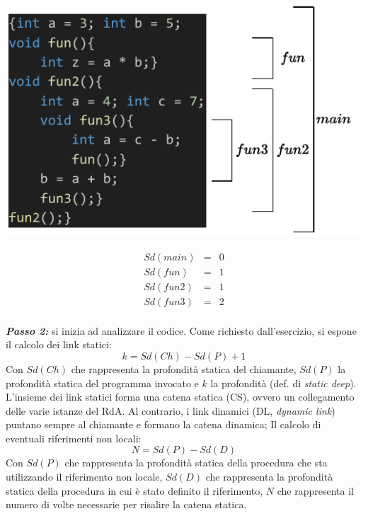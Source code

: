 \documentclass[a4paper]{article}
\begin{document}
	\noindent
	\begin{minipage}{.7\textwidth}
		\begin{center}
			\includegraphics[width=\textwidth]{img/ex3-014.pdf}
		\end{center}
	\end{minipage}
	\begin{minipage}{.3\textwidth}
		\begin{equation*}
			\begin{array}{rcl}
				Sd\left(main\right) &=& 0 \\
				Sd\left(fun\right) &=& 1 \\
				Sd\left(fun2\right) &=& 1 \\
				Sd\left(fun3\right) &=& 2 \\
			\end{array}
		\end{equation*}
	\end{minipage}\newline
	
	\noindent
	\textbf{\emph{Passo 2:}} si inizia ad analizzare il codice. Come richiesto dall'esercizio, si espone il calcolo dei link statici:
	\begin{equation*}
		k = Sd(Ch) - Sd(P) + 1
	\end{equation*}
	Con $Sd(Ch)$ che rappresenta la profondità statica del chiamante, $Sd(P)$ la profondità statica del programma invocato e $k$ la profondità (def. di \emph{static deep}). L'insieme dei link statici forma una catena statica (CS), ovvero un collegamento delle varie istanze del RdA. Al contrario, i link dinamici (DL, \emph{dynamic link}) puntano sempre al chiamante e formano la catena dinamica;\newline
	Il calcolo di eventuali riferimenti non locali:
	\begin{equation*}
		N = Sd(P) - Sd(D)
	\end{equation*}
	Con $Sd(P)$ che rappresenta la profondità statica della procedura che sta utilizzando il riferimento non locale, $Sd(D)$ che rappresenta la profondità statica della procedura in cui è stato definito il riferimento, $N$ che rappresenta il numero di volte necessarie per risalire la catena statica.\newpage
	
\end{document}
